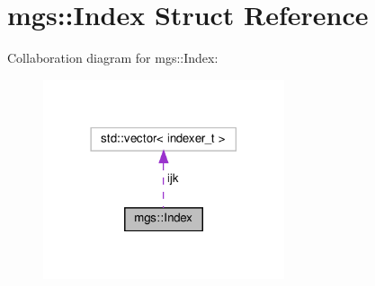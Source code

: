 \hypertarget{structmgs_1_1Index}{}\section{mgs\+:\+:Index Struct Reference}
\label{structmgs_1_1Index}


Collaboration diagram for mgs\+:\+:Index\+:
\nopagebreak
\begin{figure}[H]
\begin{center}
\leavevmode
\includegraphics[width=201pt]{structmgs_1_1Index__coll__graph}
\end{center}
\end{figure}
